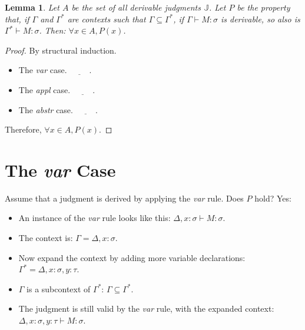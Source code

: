 \documentclass{book}
\numberwithin{equation}{chapter}
\newcommand{\blank}{\underline{\hspace{1cm}}}
\newtheorem*{anon-lemma}{Lemma}
\begin{document}
\noindent
\hrulefill

\begin{anon-lemma}
Let $A$ be the set of all derivable judgments $\mathbb{J}$. Let $P$ be the property that, if $\Gamma$ and $\Gamma^{*}$ are contexts such that $\Gamma \subseteq \Gamma^{*}$, if $\Gamma \vdash M : \sigma$ is derivable, so also is $\Gamma^{*} \vdash M : \sigma$. Then: $\forall x \in A, P(x)$.
\end{anon-lemma}

\begin{proof}
By structural induction.

\begin{itemize}
\item{The \textit{var} case. $\blank$.}
\item{The \textit{appl} case. $\blank$.}
\item{The \textit{abstr} case. $\blank$.}
\end{itemize}

\noindent
Therefore, $\forall x \in A, P(x)$.
\end{proof}

\noindent
\hrulefill
\newline


\section{The \textit{var} Case}

Assume that a judgment is derived by applying the \textit{var} rule. Does $P$ hold? Yes:

\begin{itemize}
\item{An instance of the \textit{var} rule looks like this: $\Delta, x : \sigma \vdash M : \sigma$.}
\item{The context is: $\Gamma = \Delta, x : \sigma$.}
\item{Now expand the context by adding more variable declarations: $\Gamma^{*} = \Delta, x : \sigma, y : \tau$.}
\item{$\Gamma$ is a subcontext of $\Gamma^{*}$: $\Gamma \subseteq \Gamma^{*}$.}
\item{The judgment is still valid by the \textit{var} rule, with the expanded context: $\Delta, x : \sigma, y : \tau \vdash M : \sigma$.}
\end{itemize}

\noindent
\hrulefill
\end{document}
